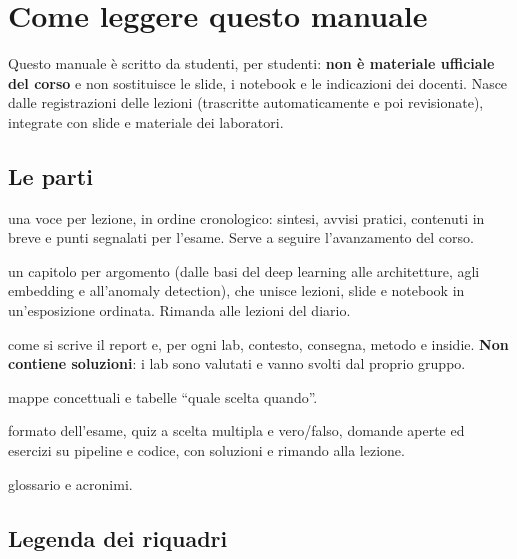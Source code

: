 \chapter*{Come leggere questo manuale}

Questo manuale è scritto da studenti, per studenti: \textbf{non è materiale ufficiale del corso} e non
sostituisce le slide, i notebook e le indicazioni dei docenti. Nasce dalle registrazioni delle
lezioni (trascritte automaticamente e poi revisionate), integrate con slide e materiale dei laboratori.

\section*{Le parti}
\begin{description}[leftmargin=2em,style=nextline]
  \item[Diario delle lezioni] una voce per lezione, in ordine cronologico: sintesi, avvisi pratici,
    contenuti in breve e punti segnalati per l'esame. Serve a seguire l'avanzamento del corso.
  \item[Manuale del corso] un capitolo per argomento (dalle basi del deep learning alle architetture,
    agli embedding e all'anomaly detection), che unisce lezioni, slide e notebook in un'esposizione
    ordinata. Rimanda alle lezioni del diario.
  \item[Laboratori] come si scrive il report e, per ogni lab, contesto, consegna, metodo e insidie.
    \textbf{Non contiene soluzioni}: i lab sono valutati e vanno svolti dal proprio gruppo.
  \item[Schemi di ripasso] mappe concettuali e tabelle ``quale scelta quando''.
  \item[Quiz ed esame] formato dell'esame, quiz a scelta multipla e vero/falso, domande aperte ed
    esercizi su pipeline e codice, con soluzioni e rimando alla lezione.
  \item[Appendice] glossario e acronimi.
\end{description}

\section*{Legenda dei riquadri}

